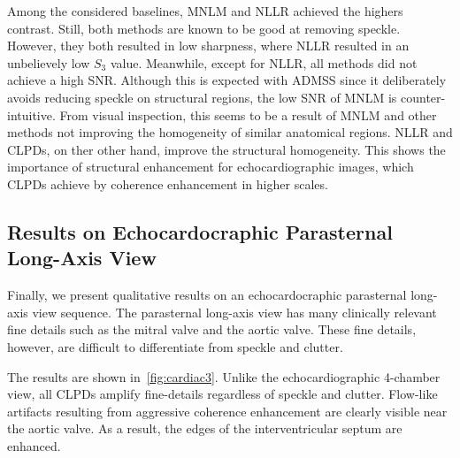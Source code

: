 Among the considered baselines, MNLM and NLLR achieved the highers contrast.
Still, both methods are known to be good at removing speckle.
However, they both resulted in low sharpness, where NLLR resulted in an unbelievely low \(S_3\) value.
Meanwhile, except for NLLR, all methods did not achieve a high SNR.
Although this is expected with ADMSS since it deliberately avoids reducing speckle on structural regions, the low SNR of MNLM is counter-intuitive.
From visual inspection, this seems to be a result of MNLM and other methods not improving the homogeneity of similar anatomical regions.
NLLR and CLPDs, on ther other hand, improve the structural homogeneity.
This shows the importance of structural enhancement for echocardiographic images, which CLPDs achieve by coherence enhancement in higher scales.

\subsection{Results on Echocardocraphic Parasternal Long-Axis View}
Finally, we present qualitative results on an echocardocraphic parasternal long-axis view sequence.
The parasternal long-axis view has many clinically relevant fine details such as the mitral valve and the aortic valve.
These fine details, however, are difficult to differentiate from speckle and clutter.

The results are shown in~\cref{fig:cardiac3}.
Unlike the echocardiographic 4-chamber view, all CLPDs amplify fine-details regardless of speckle and clutter.
Flow-like artifacts resulting from aggressive coherence enhancement are clearly visible near the aortic valve.
As a result, the edges of the interventricular septum are enhanced.

